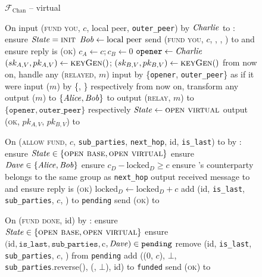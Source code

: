 \begin{figure}[H]
  \begin{systembox}{$\mathcal{F}_{\mathrm{Chan}}$ -- virtual}
    \begin{algorithmic}[1]
      \State On input (\textsc{fund you}, $c$, local peer, \texttt{outer\_peer})
      by $\mathit{Charlie}$ to \alice: 
      \label{code:functionality:chan:skeleton:virtual:fund-you}
      \Indent
        \State ensure $\mathit{State} = \textsc{init}$
        \State $\mathit{Bob} \gets \text{local peer}$
        \State send (\textsc{fund you}, $c$, \bob, \charlie, \alice) to
        \adversary and ensure reply is \textsc{(ok)}
        \label{code:functionality:chan:skeleton:virtual:inform}
        \State $c_A \gets c; c_B \gets 0$
        \State $\mathtt{opener} \gets \mathit{Charlie}$
        \State $(sk_{A, V}, pk_{A, V}) \gets \textsc{keyGen}()$; $(sk_{B, V},
        pk_{B, V}) \gets \textsc{keyGen}()$
        \State from now on, handle any (\textsc{relayed}, $m$) input by
        \{\texttt{opener}, \texttt{outer\_peer}\} as if it were input ($m$) by
        \{\alice, \bob\} respectively
        \State from now on, transform any output ($m$) to $\{\mathit{Alice}, \mathit{Bob}\}$ to
        output (\textsc{relay}, $m$) to $\{\mathtt{opener},
        \mathtt{outer\_peer}\}$ respectively
        \State $\mathit{State} \gets \textsc{open virtual}$
        \State output (\textsc{ok}, $pk_{A, V}$, $pk_{B, V}$) to \charlie
      \EndIndent
      \Statex

      \State On (\textsc{allow fund}, $c$, \texttt{sub\_parties},
      \texttt{next\_hop}, id, \texttt{is\_last}) to \dave by \charlie:
      \label{code:functionality:chan:skeleton:virtual:allow-fund}
      \Indent
        \State ensure $\mathit{State} \in \{\textsc{open base}, \textsc{open
        virtual}\}$
        \State ensure $\mathit{Dave} \in \{\mathit{Alice}, \mathit{Bob}\}$ 
        \State ensure $c_D - \mathrm{locked}_D \geq c$
        \State ensure \dave's counterparty belongs to the same group as
        \texttt{next\_hop}
        \State output received message to \dave and ensure reply is
        \textsc{(ok)}
        \State $\mathrm{locked}_D \gets \mathrm{locked}_D + c$
        \State add (id, \texttt{is\_last}, \texttt{sub\_parties}, $c$, \dave) to
        \texttt{pending}
        \State send (\textsc{ok}) to \charlie
      \EndIndent
      \Statex

      \State On (\textsc{fund done}, id) by \charlie:
      \Indent
        \State ensure $\mathit{State} \in \{\textsc{open base}, \textsc{open
        virtual}\}$
        \State ensure $(\mathrm{id}, \mathtt{is\_last}, \mathtt{sub\_parties},
        $c$, \mathit{Dave}) \in \mathtt{pending}$
        \State remove (id, \texttt{is\_last}, \texttt{sub\_parties}, $c$, \dave)
        from \texttt{pending}
          \State add ((0, $c$), $\bot$, \texttt{sub\_parties}.reverse(),
          (\dave, $\bot$), id) to \texttt{funded}
        \EndIf
        \State send (\textsc{ok}) to \charlie
      \EndIndent
      \Statex


\end{algorithmic}
\end{systembox}
\end{figure}
